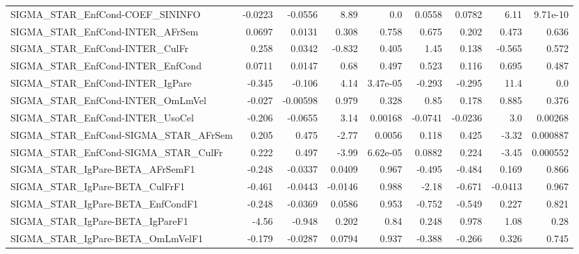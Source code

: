 \begin{tabular}{lrrrrrrrr}
SIGMA\_STAR\_EnfCond-COEF\_SININFO       &     -0.0223 &      -0.0556 &     8.89 &      0.0 &     0.0558 &      0.0782 &         6.11 &      9.71e-10 \\
SIGMA\_STAR\_EnfCond-INTER\_AFrSem       &      0.0697 &       0.0131 &    0.308 &    0.758 &      0.675 &       0.202 &        0.473 &         0.636 \\
SIGMA\_STAR\_EnfCond-INTER\_CulFr        &       0.258 &       0.0342 &   -0.832 &    0.405 &       1.45 &       0.138 &       -0.565 &         0.572 \\
SIGMA\_STAR\_EnfCond-INTER\_EnfCond      &      0.0711 &       0.0147 &     0.68 &    0.497 &      0.523 &       0.116 &        0.695 &         0.487 \\
SIGMA\_STAR\_EnfCond-INTER\_IgPare       &      -0.345 &       -0.106 &     4.14 & 3.47e-05 &     -0.293 &      -0.295 &         11.4 &           0.0 \\
SIGMA\_STAR\_EnfCond-INTER\_OmLmVel      &      -0.027 &     -0.00598 &    0.979 &    0.328 &       0.85 &       0.178 &        0.885 &         0.376 \\
SIGMA\_STAR\_EnfCond-INTER\_UsoCel       &      -0.206 &      -0.0655 &     3.14 &  0.00168 &    -0.0741 &     -0.0236 &          3.0 &       0.00268 \\
SIGMA\_STAR\_EnfCond-SIGMA\_STAR\_AFrSem  &       0.205 &        0.475 &    -2.77 &   0.0056 &      0.118 &       0.425 &        -3.32 &      0.000887 \\
SIGMA\_STAR\_EnfCond-SIGMA\_STAR\_CulFr   &       0.222 &        0.497 &    -3.99 & 6.62e-05 &     0.0882 &       0.224 &        -3.45 &      0.000552 \\
SIGMA\_STAR\_IgPare-BETA\_AFrSemF1       &      -0.248 &      -0.0337 &   0.0409 &    0.967 &     -0.495 &      -0.484 &        0.169 &         0.866 \\
SIGMA\_STAR\_IgPare-BETA\_CulFrF1        &      -0.461 &      -0.0443 &  -0.0146 &    0.988 &      -2.18 &      -0.671 &      -0.0413 &         0.967 \\
SIGMA\_STAR\_IgPare-BETA\_EnfCondF1      &      -0.248 &      -0.0369 &   0.0586 &    0.953 &     -0.752 &      -0.549 &        0.227 &         0.821 \\
SIGMA\_STAR\_IgPare-BETA\_IgPareF1       &       -4.56 &       -0.948 &    0.202 &     0.84 &      0.248 &       0.978 &         1.08 &          0.28 \\
SIGMA\_STAR\_IgPare-BETA\_OmLmVelF1      &      -0.179 &      -0.0287 &   0.0794 &    0.937 &     -0.388 &      -0.266 &        0.326 &         0.745 \\

\end{tabular}
